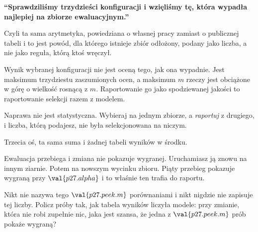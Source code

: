 \begin{fr}
\begin{trapbox}
\textbf{\enquote{Sprawdziliśmy trzydzieści konfiguracji i wzięliśmy tę, która
wypadła najlepiej na zbiorze ewaluacyjnym.}}

Czyli ta sama arytmetyka, powiedziana o własnej pracy zamiast o publicznej
tabeli \dash{} i to jest powód, dla którego istnieje zbiór odłożony, podany
jako liczba, a nie jako reguła, którą ktoś wręczył.

Wynik wybranej konfiguracji nie jest oceną tego, jak ona wypadnie. Jest
maksimum trzydziestu zaszumionych ocen, a maksimum $m$ rzeczy jest obciążone w
górę o wielkość rosnącą z $m$. Raportowanie go jako spodziewanej jakości to
raportowanie selekcji razem z modelem.

Naprawa nie jest statystyczna. Wybieraj na jednym zbiorze, a \emph{raportuj} z
drugiego, i liczba, którą podajesz, nie była selekcjonowana na niczym.
\end{trapbox}
\end{fr}

\begin{fr}
Trzecia oś, ta sama suma i żadnej tabeli wyników w środku.

Ewaluacja przebiega i zmiana nie pokazuje wygranej. Uruchamiasz ją znowu na
innym ziarnie. Potem na nowszym wycinku zbioru. Piąty przebieg pokazuje
wygraną przy $\val{p27.alpha}$ i to właśnie ten trafia do raportu.

Nikt nie nazywa tego $\val{p27.peek.m}$ porównaniami i nikt nigdzie nie
zapisuje tej liczby. Policz próby tak, jak tabela wyników liczyła modele: przy
zmianie, która nie robi zupełnie nic, jaka jest szansa, że jedna z
$\val{p27.peek.m}$ prób pokaże wygraną?
\dotline
\nextframe
\end{fr}

